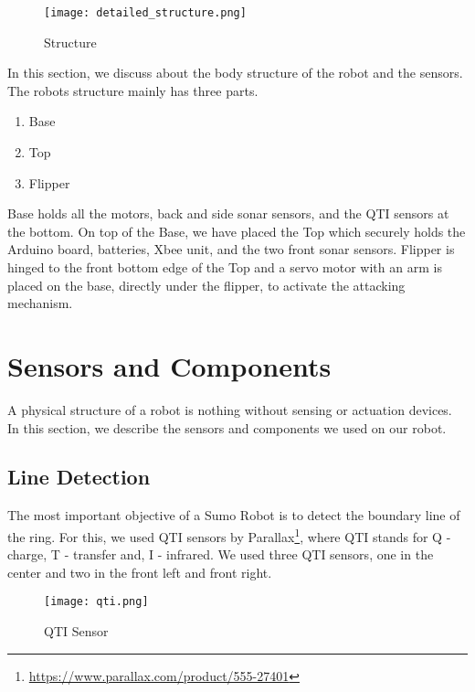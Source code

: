 \documentclass[11pt, letterpaper, oneside]{article}
\begin{document}
\begin{figure}[bth]
	\begin{center}
		\texttt{[image: detailed\_structure.png]}
		\caption{Structure}
		\label{fig:detailed_structure}
	\end{center}
\end{figure}

In this section, we discuss about the body structure of the robot and the sensors. The robots structure mainly has three parts. 
\begin{enumerate}
	\item Base
	\item Top
	\item Flipper
\end{enumerate}


Base holds all the motors, back and side sonar sensors, and the QTI sensors at the bottom. On top of the Base, we have placed the Top which securely holds the Arduino board, batteries, Xbee unit, and the two front sonar sensors. Flipper is hinged to the front bottom edge of the Top and a servo motor with an arm is placed on the base, directly under the flipper, to activate the attacking mechanism.



\newpage
\section{Sensors and Components}
A physical structure of a robot is nothing without sensing or actuation devices. In this section, we describe the sensors and components we used on our robot. \\

\subsection{Line Detection}
The most important objective of a Sumo Robot is to detect the boundary line of the ring. For this, we used QTI sensors by Parallax\footnote{\url{https://www.parallax.com/product/555-27401}}, where QTI stands for Q - charge, T - transfer and, I - infrared. We used three QTI sensors, one in the center and two in the front left and front right.
\begin{figure}[bth]
	\begin{center}
		\texttt{[image: qti.png]}
		\caption{QTI Sensor}
		\label{fig:qti}
	\end{center}
\end{figure}
\end{document}
